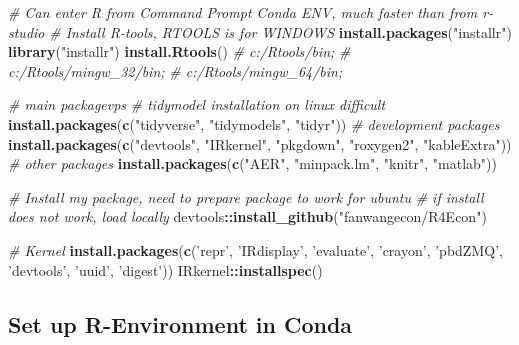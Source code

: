 \documentclass[]{article}
\newenvironment{Shaded}{\begin{snugshade}}{\end{snugshade}}
\newcommand{\CommentTok}[1]{\textcolor[rgb]{0.56,0.35,0.01}{\textit{#1}}}
\newcommand{\KeywordTok}[1]{\textcolor[rgb]{0.13,0.29,0.53}{\textbf{#1}}}
\newcommand{\NormalTok}[1]{#1}
\newcommand{\OperatorTok}[1]{\textcolor[rgb]{0.81,0.36,0.00}{\textbf{#1}}}
\newcommand{\StringTok}[1]{\textcolor[rgb]{0.31,0.60,0.02}{#1}}
\begin{document}
\begin{Shaded}
\begin{Highlighting}[]
\CommentTok{# Can enter R from Command Prompt Conda ENV, much faster than from r-studio}
\CommentTok{# Install R-tools, RTOOLS is for WINDOWS}
\KeywordTok{install.packages}\NormalTok{(}\StringTok{"installr"}\NormalTok{)}
\KeywordTok{library}\NormalTok{(}\StringTok{"installr"}\NormalTok{)}
\KeywordTok{install.Rtools}\NormalTok{()}
\CommentTok{# c:/Rtools/bin;}
\CommentTok{# c:/Rtools/mingw_32/bin;}
\CommentTok{# c:/Rtools/mingw_64/bin;}

\CommentTok{# main packagevps}
\CommentTok{# tidymodel installation on linux difficult}
\KeywordTok{install.packages}\NormalTok{(}\KeywordTok{c}\NormalTok{(}\StringTok{"tidyverse"}\NormalTok{, }\StringTok{"tidymodels"}\NormalTok{, }\StringTok{"tidyr"}\NormalTok{))}
\CommentTok{# development packages}
\KeywordTok{install.packages}\NormalTok{(}\KeywordTok{c}\NormalTok{(}\StringTok{"devtools"}\NormalTok{, }\StringTok{"IRkernel"}\NormalTok{, }\StringTok{"pkgdown"}\NormalTok{, }\StringTok{"roxygen2"}\NormalTok{, }\StringTok{"kableExtra"}\NormalTok{))}
\CommentTok{# other packages}
\KeywordTok{install.packages}\NormalTok{(}\KeywordTok{c}\NormalTok{(}\StringTok{"AER"}\NormalTok{, }\StringTok{"minpack.lm"}\NormalTok{, }\StringTok{"knitr"}\NormalTok{, }\StringTok{"matlab"}\NormalTok{))}

\CommentTok{# Install my package, need to prepare package to work for ubuntu}
\CommentTok{# if install does not work, load locally}
\NormalTok{devtools}\OperatorTok{::}\KeywordTok{install_github}\NormalTok{(}\StringTok{"fanwangecon/R4Econ"}\NormalTok{)}

\CommentTok{# Kernel}
\KeywordTok{install.packages}\NormalTok{(}\KeywordTok{c}\NormalTok{(}\StringTok{'repr'}\NormalTok{, }\StringTok{'IRdisplay'}\NormalTok{, }\StringTok{'evaluate'}\NormalTok{, }\StringTok{'crayon'}\NormalTok{, }\StringTok{'pbdZMQ'}\NormalTok{, }\StringTok{'devtools'}\NormalTok{, }\StringTok{'uuid'}\NormalTok{, }\StringTok{'digest'}\NormalTok{))}
\NormalTok{IRkernel}\OperatorTok{::}\KeywordTok{installspec}\NormalTok{()}
\end{Highlighting}
\end{Shaded}

\hypertarget{set-up-r-environment-in-conda}{%
\subsection{Set up R-Environment in
Conda}\label{set-up-r-environment-in-conda}}
\end{document}
